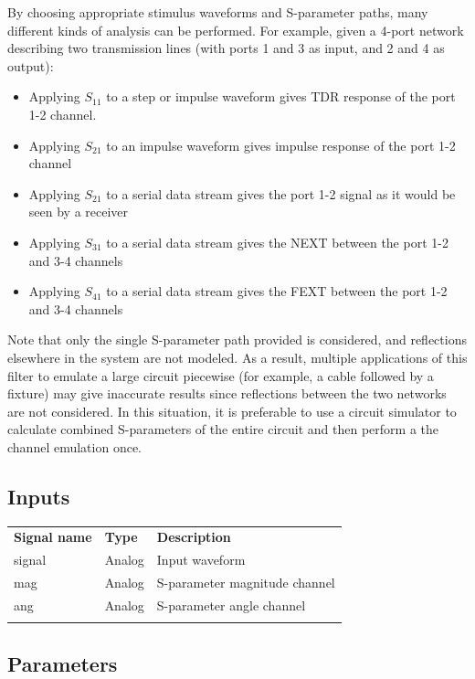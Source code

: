 By choosing appropriate stimulus waveforms and S-parameter paths, many different kinds of analysis can be performed.
For example, given a 4-port network describing two transmission lines (with ports 1 and 3 as input, and 2 and 4 as
output):
\begin{itemize}
\item Applying $S_{11}$ to a step or impulse waveform gives TDR response of the port 1-2 channel.
\item Applying $S_{21}$ to an impulse waveform gives impulse response of the port 1-2 channel
\item Applying $S_{21}$ to a serial data stream gives the port 1-2 signal as it would be seen by a receiver
\item Applying $S_{31}$ to a serial data stream gives the NEXT between the port 1-2 and 3-4 channels
\item Applying $S_{41}$ to a serial data stream gives the FEXT between the port 1-2 and 3-4 channels
\end{itemize}

Note that only the single S-parameter path provided is considered, and reflections elsewhere in the system are not
modeled. As a result, multiple applications of this filter to emulate a large circuit piecewise (for example, a
cable followed by a fixture) may give inaccurate results since reflections between the two networks are not considered.
In this situation, it is preferable to use a circuit simulator to calculate combined S-parameters of the entire circuit
and then perform a the channel emulation once.

\subsection{Inputs}

\begin{tabularx}{16cm}{llX}
\thickhline
\textbf{Signal name} & \textbf{Type} & \textbf{Description} \\
\thickhline
signal & Analog & Input waveform \\
\thinhline
mag & Analog & S-parameter magnitude channel \\
\thinhline
ang & Analog & S-parameter angle channel \\
\thickhline
\end{tabularx}

\subsection{Parameters}

